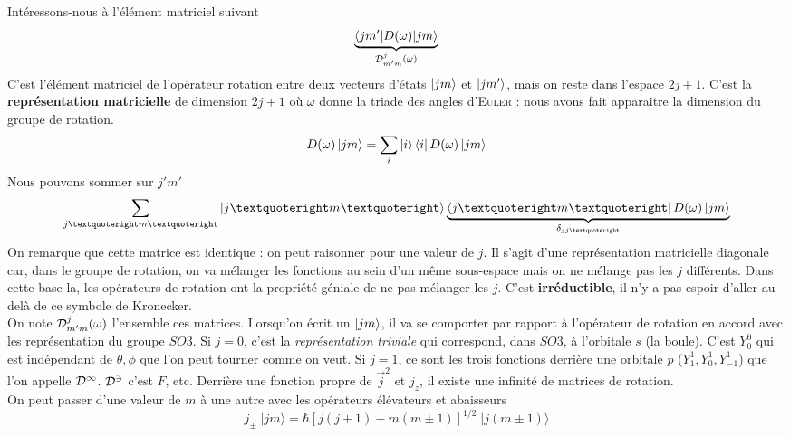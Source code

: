 Intéressons-nous à l'élément matriciel suivant
\begin{equation}
\underbrace{
\langle jm' \vert  D(\omega) \vert j m \rangle}
_{ {\cal  D}^j_{m'm} (\omega) }
\end{equation}
C'est l'élément matriciel de l'opérateur rotation entre deux vecteurs d'états $\ket{jm}$ et
$\ket{jm'}$, mais on reste dans l'espace $2j+1$. C'est la \textbf{représentation matricielle} de
dimension $2j+1$ où $\omega$ donne la triade des angles d'\textsc{Euler} : nous avons fait apparaitre
la dimension du groupe de rotation.
\begin{equation}
D(\omega)\ket{jm} = \sum_i \ket{i}\bra{i} D(\omega)\ket{jm}
\end{equation}
Nous pouvons sommer sur $j'm'$
\begin{equation}
\sum_{j’m’} \ket{j’m’}\underbrace{\bra{j’m’} D(\omega)\ket{jm}}_{\delta_{jj’}}
\end{equation}
On remarque que cette matrice est identique : on peut raisonner pour une valeur de $j$. Il s'agit
d'une représentation matricielle diagonale car, dans le groupe de rotation, on va mélanger les
fonctions au sein d'un même sous-espace mais on ne mélange pas les $j$ différents. Dans cette
base la, les opérateurs de rotation ont la propriété géniale de ne pas mélanger les $j$. C'est
\textbf{irréductible}, il n'y a pas espoir d'aller au delà de ce symbole de Kronecker.\\

On note ${\cal  D}^j_{m'm} (\omega)$ l'ensemble ces matrices. Lorsqu'on écrit un $\ket{jm}$, 
il va se comporter par rapport à l'opérateur de rotation en accord avec les représentation
du groupe $SO3$. Si $j=0$, c'est la \textit{représentation triviale} qui correspond, dans 
$SO3$, à l'orbitale $s$ (la boule). C'est $Y_0^0$ qui est indépendant de $\theta,\phi$ que
l'on peut tourner comme on veut. Si $j=1$, ce sont les trois fonctions derrière une orbitale
$p$ ($Y^1_1,Y^1_0,Y^1_{-1}$) que l'on appelle $\cal{D}^1$. $\cal{D}^3$ c'est $F$, etc. Derrière
une fonction propre de $\vec j^2$ et $j_z$, il existe une infinité de matrices de rotation.\\

On peut passer d'une valeur de $m$ à une autre avec les opérateurs élévateurs et abaisseurs
\begin{equation}
j_{\pm} \; \vert j m \rangle  =  
\hbar 
[ j(j+1) - m(m \pm 1) ]^{1/2}  
\; \vert j (m \pm 1) \rangle
\end{equation}


